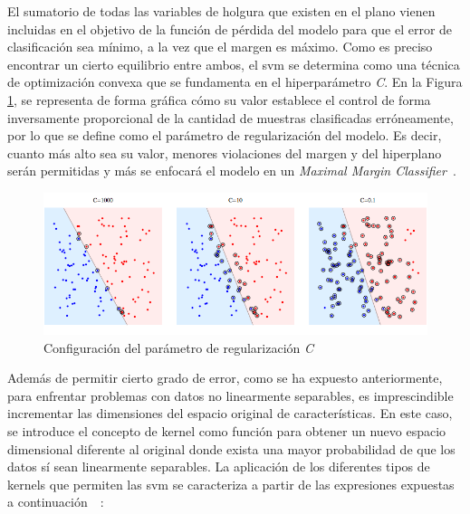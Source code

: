 \pagebreak

El sumatorio de todas las variables de holgura que existen en el plano vienen incluidas en el objetivo de la función de pérdida del modelo para que el error de clasificación sea mínimo, a la vez que el margen es máximo. Como es preciso encontrar un cierto equilibrio entre ambos, el \gls{svm} se determina como una técnica de optimización convexa que se fundamenta en el hiperparámetro \textit{C}. En la Figura \ref{fig:parametroc}, se representa de forma gráfica cómo su valor establece el control de forma inversamente proporcional de la cantidad de muestras clasificadas erróneamente, por lo que se define como el parámetro de regularización del modelo. Es decir, cuanto más alto sea su valor, menores violaciones del margen y del hiperplano serán permitidas y más se enfocará el modelo en un \textit{Maximal Margin Classifier}~\cite{svmciencia}.

\vspace{3mm}

\begin{figure}[h!]
    \centering
    \includegraphics[width=1\textwidth]{img/teoria/parametroc.png}
    \caption{Configuración del parámetro de regularización \textit{C} \cite{velocity}}
    \label{fig:parametroc}
\end{figure}

\vspace{3mm}

Además de permitir cierto grado de error, como se ha expuesto anteriormente, para enfrentar problemas con datos no linearmente separables, es imprescindible incrementar las dimensiones del espacio original de características. En este caso, se introduce el concepto de kernel como función para obtener un nuevo espacio dimensional diferente al original donde exista una mayor probabilidad de que los datos sí sean linearmente separables. La aplicación de los diferentes tipos de kernels que permiten las \gls{svm} se caracteriza a partir de las expresiones expuestas a continuación~\cite{svmciencia}~\cite{velocity}:

